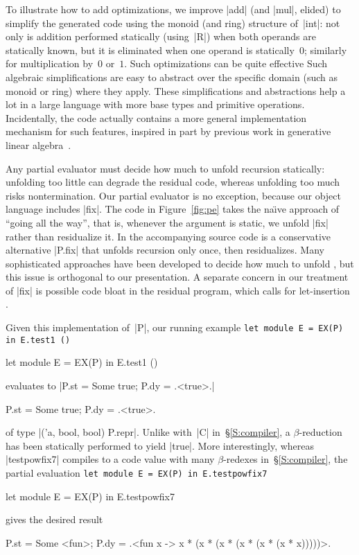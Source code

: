 To illustrate how to add optimizations, we improve |add| (and |mul|,
elided) to simplify the generated code using the monoid (and ring)
structure of~|int|: not only is addition performed statically
(using~|R|) when both operands are statically known, but it is
eliminated when one operand is statically~$0$; similarly for
multiplication by~$0$ or~$1$.  
\ifshort
Such optimizations can be quite effective
\else
Such algebraic simplifications are easy
to abstract over the specific domain (such as monoid or ring) where they
apply.  These simplifications and abstractions help a lot
\fi
in a large language with more base types and primitive operations.
\ifshort\else
Incidentally, the code actually contains a more general implementation
mechanism for such features, inspired in part by previous work in
generative linear algebra~\citep{CaretteKiselyov05}.
\fi

Any partial evaluator must decide how much to unfold recursion
statically: unfolding too little can degrade the residual code, whereas
unfolding too much risks nontermination.  Our partial evaluator is no
exception, because our object language includes |fix|.  The code in
Figure~\ref{fig:pe} takes the na\"\i ve approach of ``going all the
way'', that is, whenever the 
argument is static, we unfold |fix| rather than residualize it.
In the accompanying source code is a conservative
alternative |P.fix| that unfolds recursion only once, then residualizes.
Many sophisticated approaches have been developed to decide how much to unfold
\citep{jones-partial}, but this issue is orthogonal to our presentation.
\ifshort\else
A separate concern in our treatment of |fix| is possible code bloat in
the residual program, which calls for let-insertion
\citep{SwadiTahaKiselyovPasalic2006}.
\fi


Given this implementation of~|P|, our running example
\ifshort
\texttt{let module E\,=\,EX(P) in E.test1 ()}
\else
\begin{code}
let module E = EX(P) in E.test1 ()
\end{code}
\fi
evaluates to
\ifshort
|{P.st = Some true; P.dy = .<true>.}|
\else
\begin{code}
{P.st = Some true; P.dy = .<true>.}
\end{code}
\fi
of type |('a, bool, bool) P.repr|.  Unlike with~|C| in~\S\ref{S:compiler},
a $\beta$-reduction has been statically performed to yield |true|.  More
interestingly, whereas |testpowfix7| compiles to a code value with many
$\beta$-redexes in~\S\ref{S:compiler}, the partial evaluation
\ifshort
\texttt{let module E = EX(P) in E.testpowfix7}
\else
\begin{code}
let module E = EX(P) in E.testpowfix7
\end{code}
\fi
gives the desired result
\ifshort\vspace*{-0.7em}\fi
\begin{code}
{P.st = Some <fun>;
 P.dy = .<fun x -> x * (x * (x * (x * (x * (x * x)))))>.}
\end{code}
\ifshort\vspace*{-0.7em}\fi

